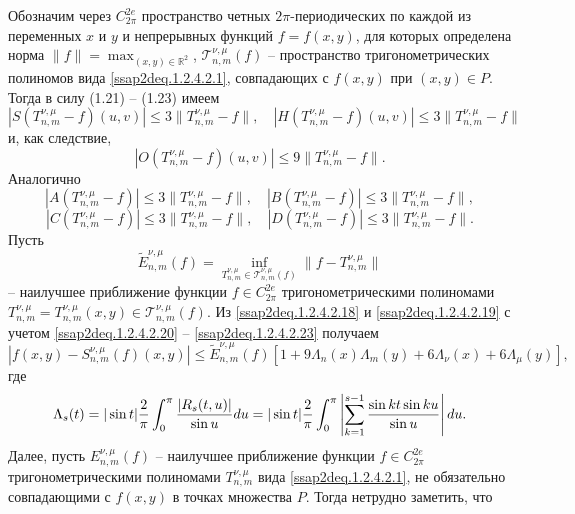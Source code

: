 Обозначим через $C^{2e}_{2\pi}$
пространство четных $2\pi$-периодических по каждой из переменных $x$ и  $y$ и непрерывных функций $f=f(x,y)$, для которых определена норма
$\|f\|=\max_{(x,y)\in \mathbb{R}^2} $, $\mathcal{T}_{n,m}^{\nu,\mu}(f)$ -- пространство тригонометрических полиномов вида \eqref{ssap2deq.1.2.4.2.1}, совпадающих с $f(x,y)$ при $(x,y)\in P$. Тогда  в силу (1.21) -- (1.23) имеем
\begin{equation}\label{ssap2deq.1.2.4.2.20}
|S(T_{n,m}^{\nu,\mu}-f)(u,v)|\le 3\|T_{n,m}^{\nu,\mu}-f\|, \quad |H(T_{n,m}^{\nu,\mu}-f)(u,v)|\le 3\|T_{n,m}^{\nu,\mu}-f\|
\end{equation}
и, как следствие,
\begin{equation}\label{ssap2deq.1.2.4.2.21}
|O(T_{n,m}^{\nu,\mu}-f)(u,v)|\le 9\|T_{n,m}^{\nu,\mu}-f\|.
\end{equation}
Аналогично
\begin{equation}\label{ssap2deq.1.2.4.2.22}
|A(T_{n,m}^{\nu,\mu}-f)|\le 3\|T_{n,m}^{\nu,\mu}-f\|,\quad |B(T_{n,m}^{\nu,\mu}-f)|\le 3\|T_{n,m}^{\nu,\mu}-f\|,
\end{equation}
\begin{equation}\label{ssap2deq.1.2.4.2.23}
|C(T_{n,m}^{\nu,\mu}-f)|\le 3\|T_{n,m}^{\nu,\mu}-f\|,\quad |D(T_{n,m}^{\nu,\mu}-f)|\le 3\|T_{n,m}^{\nu,\mu}-f\|.
\end{equation}
 Пусть
$$
 \tilde E_{n,m}^{\nu,\mu}(f)=\inf_{T_{n,m}^{\nu,\mu}\in \mathcal{T}_{n,m}^{\nu,\mu}(f)}\|f-T_{n,m}^{\nu,\mu}\|
$$
-- наилучшее приближение функции $f\in C^{2e}_{2\pi}$  тригонометрическими полиномами $T_{n,m}^{\nu,\mu}=T_{n,m}^{\nu,\mu}(x,y)\in\mathcal{T}_{n,m}^{\nu,\mu}(f)$. Из \eqref{ssap2deq.1.2.4.2.18} и \eqref{ssap2deq.1.2.4.2.19} с учетом \eqref{ssap2deq.1.2.4.2.20} -- \eqref{ssap2deq.1.2.4.2.23} получаем
\begin{equation}\label{ssap2deq.1.2.4.2.24}
|f(x,y)-S_{n,m}^{\nu,\mu}(f)(x,y)|\le \tilde E_{n,m}^{\nu,\mu}(f)[1+9\Lambda_n(x)\Lambda_m(y)+6\Lambda_\nu(x)+6\Lambda_\mu(y)],
\end{equation}
где
\begin{equation}\label{ssap2deq.1.2.4.2.25}
\Lambda_s(t)=|\sin t|\frac2\pi\int_0^\pi{|R_s(t,u)|\over\sin u}du=|\sin t|\frac2\pi\int_0^\pi\left|\sum_{k=1}^{s-1}{\sin kt\sin ku\over \sin u}\right|du.
\end{equation}
Далее, пусть $ E_{n,m}^{\nu,\mu}(f)$ -- наилучшее приближение функции $f\in C^{2e}_{2\pi}$  тригонометрическими полиномами $T_{n,m}^{\nu,\mu}$ вида \eqref{ssap2deq.1.2.4.2.1}, не обязательно совпадающими с $f(x,y)$ в точках множества $P$. Тогда нетрудно заметить, что
